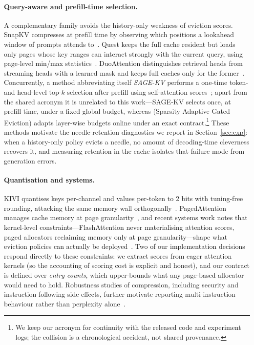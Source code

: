 \paragraph{Query-aware and prefill-time selection.}
A complementary family avoids the history-only weakness of eviction
scores. SnapKV compresses at prefill time by observing which positions a
lookahead window of prompts attends to~\cite{li2024snapkv}. Quest keeps
the full cache resident but loads only pages whose key ranges can
interact strongly with the current query, using page-level min/max
statistics~\cite{tang2024quest}. DuoAttention distinguishes retrieval
heads from streaming heads with a learned mask and keeps full caches only
for the former~\cite{xiao2024duoattention}. Concurrently, a method
abbreviating itself \emph{SAGE-KV} performs a one-time token- and
head-level top-$k$ selection after prefill using self-attention
scores~\cite{wang2025sagekv}; apart from the shared acronym it is
unrelated to this work---SAGE-KV selects once, at prefill time, under a
fixed global budget, whereas \sage{} (Sparsity-Adaptive Gated Eviction)
adapts layer-wise budgets online under an exact
contract.\footnote{We keep our acronym for continuity with the released
code and experiment logs; the collision is a chronological accident, not
shared provenance.} These methods motivate the
needle-retention diagnostics we report in Section~\ref{sec:exp}: when a
history-only policy evicts a needle, no amount of decoding-time cleverness
recovers it, and measuring retention in the cache isolates that failure
mode from generation errors.

\paragraph{Quantisation and systems.}
KIVI quantises keys per-channel and values per-token to 2 bits with
tuning-free rounding, attacking the same memory wall
orthogonally~\cite{liu2024kivi}. PagedAttention manages cache memory at
page granularity~\cite{kwon2023paged}, and recent systems work notes that
kernel-level constraints---FlashAttention never materialising attention
scores, paged allocators reclaiming memory only at page
granularity---shape what eviction policies can actually be
deployed~\cite{dao2023flashattention2,mao2026infra}. Two of our
implementation decisions respond directly to these constraints: we extract
scores from eager attention kernels (so the accounting of scoring cost is
explicit and honest), and our contract is defined over \emph{entry
counts}, which upper-bounds what any page-based allocator would need to
hold. Robustness studies of compression, including security and
instruction-following side effects, further motivate reporting
multi-instruction behaviour rather than perplexity
alone~\cite{ma2026safety}.

